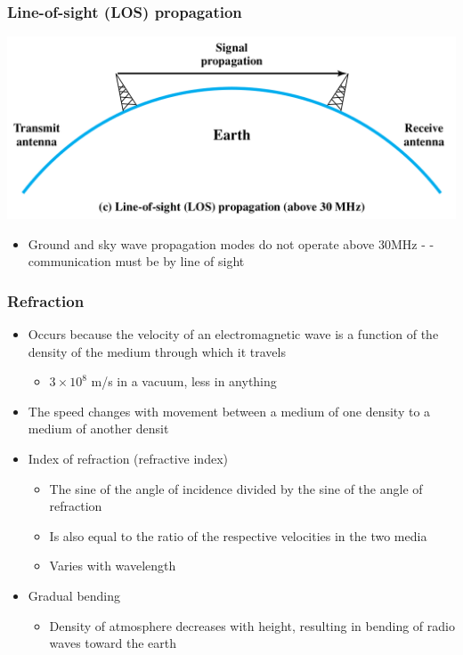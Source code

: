 \documentclass[pdflatex,compress]{beamer}
\begin{document}
\begin{frame}
	\frametitle{Line-of-sight (LOS) propagation}
	\begin{center}
		\includegraphics[height=0.4\textheight]{img/img25}
	\end{center}
	\begin{itemize}
		\item Ground and sky wave propagation modes do not operate above 30MHz - - communication must be by line of sight
	\end{itemize}
\end{frame}

\begin{frame}
	\frametitle{Refraction}
	\begin{itemize}
		\item Occurs because the velocity of an electromagnetic wave is a function of the density of the medium through which it travels
		\begin{itemize}
			\item $ 3 \times 10^8 $ m/s in a vacuum, less in anything
		\end{itemize}
 		\item The speed changes with movement between a medium of one density to a medium of another densit
		\item Index of refraction (refractive index)
		\begin{itemize}
			\item The sine of the angle of incidence divided by the sine of the angle of refraction
			\item Is also equal to the ratio of the respective velocities in the two media
			\item Varies with wavelength
		\end{itemize}
		\item Gradual bending
		\begin{itemize}
			\item Density of atmosphere decreases with height, resulting in bending of radio waves toward the earth
		\end{itemize}
	\end{itemize}
\end{frame}
\end{document}
